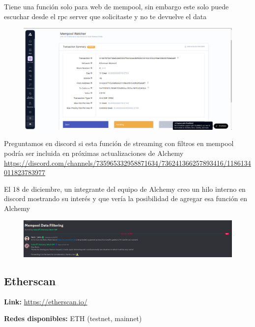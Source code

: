 Tiene una función solo para web de mempool, sin embargo este solo puede escuchar desde el rpc server que solicitaste y no te devuelve el data

\begin{figure}
    \centering
    \includegraphics[width=1\linewidth]{img//screenshots/Screenshot from 2023-12-15 23-53-11.png}  
\end{figure}

Preguntamos en discord si esta función de streaming con filtros en mempool podría ser incluida en próximas actualizaciones de Alchemy \url{https://discord.com/channels/735965332958871634/736241366257893416/1186134011823783977}

El 18 de diciembre, un integrante del equipo de Alchemy creo un hilo interno en discord mostrando su interés y que vería la posibilidad de agregar esa función en Alchemy

\begin{figure}
    \centering
    \includegraphics[width=1\linewidth]{img//screenshots/Screenshot from 2023-12-18 13-38-23.png}
    
    
\end{figure}

\clearpage
\subsection{Etherscan}

\textbf{Link:} \url{https://etherscan.io/}

\textbf{Redes disponibles:} ETH (testnet, mainnet)

